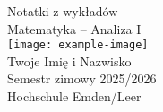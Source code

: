 
\begin{titlepage}
    \centering
    \vspace*{3cm}
    {\Huge Notatki z wykładów \\[0.5cm]}
    {\LARGE Matematyka – Analiza I \\[1cm]}
    \texttt{[image: example-image]} \\[1cm] %
    {\Large Twoje Imię i Nazwisko \\[0.5cm]}
    {\large Semestr zimowy 2025/2026 \\[2cm]}
    \vfill
    {\large Hochschule Emden/Leer}
\end{titlepage}
